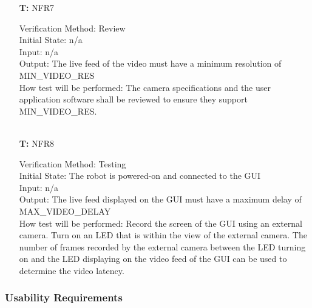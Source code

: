 \documentclass[12pt, titlepage]{article}
\newcounter{tnum} %
\begin{document}
\begin{itemize}
\item[\textbf{T\refstepcounter{tnum}\thetnum:}]{NFR7\\}

Verification Method: Review	\\				
Initial State: n/a	\\			
Input: n/a\\
Output: The live feed of the video must have a minimum resolution of  MIN\_VIDEO\_RES \\
How test will be performed: The camera specifications and the user application software shall be reviewed to ensure they support MIN\_VIDEO\_RES.\\ \\

\item[\textbf{T\refstepcounter{tnum}\thetnum:}]{NFR8\\}

Verification Method: Testing	\\				
Initial State: The robot is powered-on and connected to the GUI\\			
Input: n/a\\
Output: The live feed displayed on the GUI must have a maximum delay of MAX\_VIDEO\_DELAY \\
How test will be performed: Record the screen of the GUI using an external camera. Turn on an LED that is within the view of the external camera. The number of frames recorded by the external camera between the LED turning on and the LED displaying on the video feed of the GUI can be used to determine the video latency.

\end{itemize}

\subsubsection{Usability Requirements}
\end{document}
